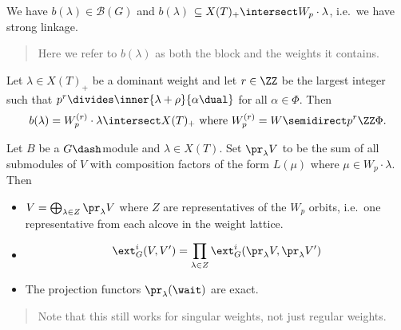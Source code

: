We have \(b(\lambda) \in \mathcal{B}(G)\) and \(b(\lambda)\)
\(\subseteq X(T)_+ \intersect W_p \cdot \lambda\), i.e.~we have strong
linkage.

\begin{quote}
Here we refer to \(b(\lambda)\) as both the block and the weights it
contains.
\end{quote}

\begin{theorem}[Donkin]

Let \(\lambda \in X(T)_+\) be a dominant weight and let \(r\in \ZZ\) be
the largest integer such that
\(p^r \divides \inner{ \lambda + \rho}{\alpha\dual}\) for all
\(\alpha\in \Phi\). Then
\begin{align*}
b(\lambda) = W_p^{(r)} \cdot \lambda \intersect X(T)_+ \text{ where } W_p^{(r)} = W\semidirect p^r \ZZ\Phi
.\end{align*}

\end{theorem}

\begin{proposition}[?]

Let \(B\) be a \(G\dash\)module and \(\lambda \in X(T)\). Set
\(\pr_\lambda V\) to be the sum of all submodules of \(V\) with
composition factors of the form \(L(\mu)\) where
\(\mu \in W_p \cdot \lambda\). Then

\begin{itemize}
\item
  \(V = \bigoplus_{\lambda \in Z} \pr_\lambda V\) where \(Z\) are
  representatives of the \(W_p\) orbits, i.e.~one representative from
  each alcove in the weight lattice.
\item

  \begin{align*} \ext_G^i(V, V') = \prod_{\lambda \in Z} \ext_G^i (\pr_\lambda V, \pr_\lambda V') \end{align*}
\item
  The projection functors \(\pr_\lambda(\wait)\) are exact.
\end{itemize}

\begin{quote}
Note that this still works for singular weights, not just regular
weights.
\end{quote}

\end{proposition}

